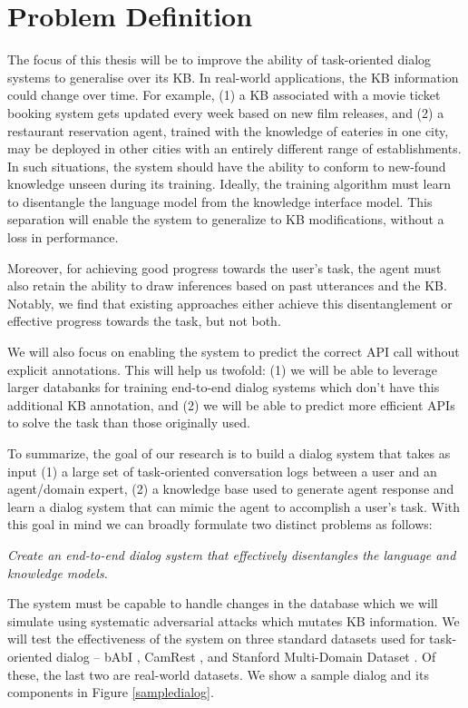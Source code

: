 \section{Problem Definition}
The focus of this thesis will be to improve the ability of task-oriented dialog systems to generalise over its KB.
In real-world applications, the KB information could change over time. For example, (1) a KB associated with a movie ticket booking system gets updated every week based on new film releases, and (2) a restaurant reservation agent, trained with the knowledge of eateries in one city, may be deployed in other cities with an entirely different range of establishments. In such situations, the system should have the ability to conform to new-found knowledge unseen during its training. Ideally, the training algorithm must learn to disentangle the language model from the knowledge interface model. This separation will enable the system to generalize to KB modifications, without a loss in performance. 

Moreover, for achieving good progress towards the user's task, the agent must also retain the ability to draw inferences based on past utterances and the KB. Notably, we find that existing approaches either achieve this disentanglement or effective progress towards the task, but not both. 

We will also focus on enabling the system to predict the correct API call without explicit annotations. This will help us twofold: (1) we will be able to leverage larger databanks for training end-to-end dialog systems which don't have this additional KB annotation, and (2) we will be able to predict more efficient APIs to solve the task than those originally used.

To summarize, the goal of our research is to build a dialog system that takes as input (1) a large set of task-oriented conversation logs between a user and an agent/domain expert, (2) a knowledge base used to generate agent response and learn a dialog system that can mimic the agent to accomplish a user's task. 
With this goal in mind we can broadly formulate two distinct problems as follows:

 {\em Create an end-to-end dialog system that effectively disentangles the language and knowledge models.}

The system must be capable to handle changes in the database which we will simulate using systematic adversarial attacks which mutates KB information. We will test the effectiveness of the system on three standard datasets used for task-oriented dialog -- bAbI \cite{BordesW16}, CamRest \cite{wenEMNLP2016}, and Stanford Multi-Domain Dataset \cite{Ericsigdial}. Of these, the last two are real-world datasets. We show a sample dialog and its components in Figure \ref{sampledialog}.

